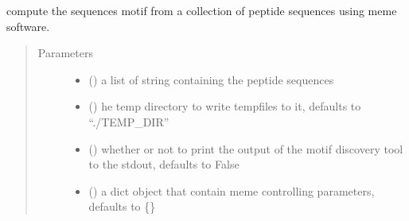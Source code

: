 \documentclass[letterpaper,10pt,english]{sphinxmanual}
\begin{document}
\begin{fulllineitems}
\label{\detokenize{IPTK.Analysis:IPTK.Analysis.AnalysisFunction.get_sequence_motif}}
compute the sequences motif from a collection of peptide sequences using meme software.
\begin{quote}\begin{description}
\item[{Parameters}] \leavevmode\begin{itemize}
\item {} 
 () \textendash{} a list of string containing the peptide sequences

\item {} 
 (\sphinxstyleliteralemphasis{\sphinxupquote{, }}) \textendash{} he temp directory to write temp\sphinxhyphen{}files to it, defaults to “./TEMP\_DIR”

\item {} 
 (\sphinxstyleliteralemphasis{\sphinxupquote{, }}) \textendash{} whether or not to print the output of the motif discovery tool to the stdout, defaults to False

\item {} 
 (\sphinxstyleliteralemphasis{\sphinxupquote{{[}}}\sphinxstyleliteralemphasis{\sphinxupquote{,}}\sphinxstyleliteralemphasis{\sphinxupquote{{]}}}\sphinxstyleliteralemphasis{\sphinxupquote{, }}) \textendash{} a dict object that contain meme controlling parameters, defaults to \{\}


\end{itemize}
\end{description}
\end{quote}
\end{fulllineitems}
\end{document}
